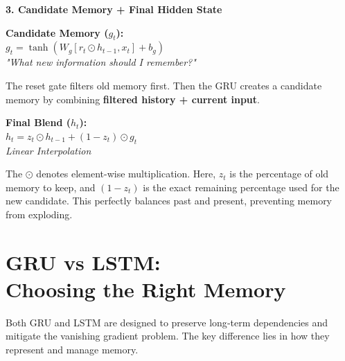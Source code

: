 \documentclass[11pt]{article}
\begin{document}
\vspace{0.1in}

\begin{infobox}[top=8pt, bottom=8pt, left=12pt, right=12pt]
{\large\color{brandnavy}\textbf{3. Candidate Memory + Final Hidden State}}

\vspace{0.05in}
{\fontsize{10}{12}\selectfont
\begin{minipage}[t]{0.48\textwidth}
\textbf{Candidate Memory ($g_t$):} \\
$g_t=\tanh(W_g[r_t\odot h_{t-1},x_t]+b_g)$ \\
\textit{"What new information should I remember?"}

\vspace{0.05in}
The reset gate filters old memory first. Then the GRU creates a candidate memory by combining \textbf{filtered history + current input}.
\end{minipage}
\hfill
\begin{minipage}[t]{0.48\textwidth}
\textbf{Final Blend ($h_t$):} \\
$h_t=z_t\odot h_{t-1} + (1-z_t)\odot g_t$ \\
\textit{Linear Interpolation}

\vspace{0.05in}
The $\odot$ denotes element-wise multiplication. Here, \textbf{$z_t$} is the percentage of old memory to keep, and \textbf{$(1-z_t)$} is the exact remaining percentage used for the new candidate. This perfectly balances past and present, preventing memory from exploding.
\end{minipage}
}
\end{infobox}

\vfill
\newpage

\section*{GRU vs LSTM:\\Choosing the Right Memory}

\vspace{0.05in}

Both GRU and LSTM are designed to preserve long‑term
dependencies and mitigate the vanishing gradient problem.
The key difference lies in how they represent and manage memory.
\end{document}

